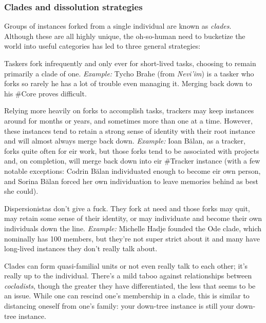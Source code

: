 \subsubsection{Clades and dissolution strategies}

Groups of instances forked from a single individual are known as \emph{clades}. Although these are all highly unique, the oh-so-human need to bucketize the world into useful categories has led to three general strategies:

\begin{description}
\tightlist
\item[Taskers]
Taskers fork infrequently and only ever for short-lived tasks, choosing to remain primarily a clade of one. \emph{Example:} Tycho Brahe (from \emph{Nevi'im}) is a tasker who forks so rarely he has a lot of trouble even managing it. Merging back down to his \#Core proves difficult.
\item[Trackers]
Relying more heavily on forks to accomplish tasks, trackers may keep instances around for months or years, and sometimes more than one at a time. However, these instances tend to retain a strong sense of identity with their root instance and will almost always merge back down. \emph{Example:} Ioan Bălan, as a tracker, forks quite often for eir work, but those forks tend to be associated with projects and, on completion, will merge back down into eir \#Tracker instance (with a few notable exceptions: Codrin Bălan individuated enough to become eir own person, and Sorina Bălan forced her own individuation to leave memories behind as best she could).
\item[Dispersionistas]
Dispersionistas don't give a fuck. They fork at need and those forks may quit, may retain some sense of their identity, or may individuate and become their own individuals down the line. \emph{Example:} Michelle Hadje founded the Ode clade, which nominally has 100 members, but they're not super strict about it and many have long-lived instances they don't really talk about.
\end{description}

Clades can form quasi-familial units or not even really talk to each other; it's really up to the individual. There's a mild taboo against relationships between \emph{cocladists}, though the greater they have differentiated, the less that seems to be an issue. While one can rescind one's membership in a clade, this is similar to distancing oneself from one's family: your down-tree instance is still your down-tree instance.

